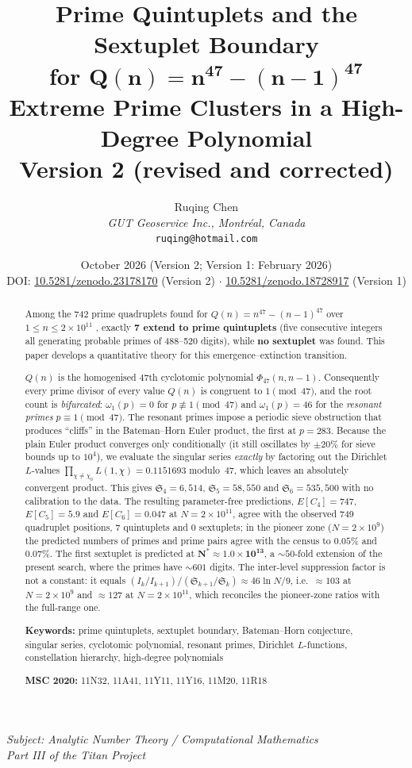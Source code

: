 ﻿\documentclass[11pt,a4paper]{article}
\title{\textbf{Prime Quintuplets and the Sextuplet Boundary} \\[6pt]
\textbf{for} $\boldsymbol{Q(n) = n^{47} - (n-1)^{47}}$ \\[6pt]
\large Extreme Prime Clusters in a High-Degree Polynomial \\[4pt]
\normalsize Version 2 (revised and corrected)}
\author{Ruqing Chen \\[4pt]
\textit{GUT Geoservice Inc., Montr\'eal, Canada} \\
\texttt{ruqing@hotmail.com}}
\date{October 2026 (Version 2; Version 1: February 2026) \\[6pt]
\normalsize DOI: \href{https://doi.org/10.5281/zenodo.23178170}{10.5281/zenodo.23178170} (Version 2)
\quad $\cdot$ \quad
\href{https://doi.org/10.5281/zenodo.18728917}{10.5281/zenodo.18728917} (Version 1)}
\newcommand{\Sk}[1]{\mathfrak{S}_{#1}}
\begin{document}
\maketitle
\thispagestyle{fancy}

\begin{center}
\textit{Subject: Analytic Number Theory / Computational Mathematics} \\[4pt]
\textit{Part III of the Titan Project}
\end{center}

\begin{abstract}
Among the 742 prime quadruplets found for
$Q(n) = n^{47} - (n{-}1)^{47}$ over $1 \leq n \leq 2 \times 10^{11}$
\cite{Chen2026b}, exactly \textbf{7 extend to prime quintuplets}
(five consecutive integers all generating probable primes of
488--520 digits), while \textbf{no sextuplet} was found.
This paper develops a quantitative theory for this emergence--extinction
transition.

$Q(n)$ is the homogenised 47th cyclotomic polynomial $\Phi_{47}(n, n{-}1)$.
Consequently every prime divisor of every value $Q(n)$ is congruent to
$1 \pmod{47}$, and the root count is \emph{bifurcated}:
$\omega_1(p) = 0$ for $p \not\equiv 1 \pmod{47}$ and
$\omega_1(p) = 46$ for the \emph{resonant primes} $p \equiv 1 \pmod{47}$.
The resonant primes impose a periodic sieve obstruction that produces
``cliffs'' in the Bateman--Horn Euler product, the first at $p = 283$.
Because the plain Euler product converges only conditionally (it still
oscillates by $\pm 20\%$ for sieve bounds up to $10^4$), we evaluate the
singular series \emph{exactly} by factoring out the Dirichlet $L$-values
$\prod_{\chi \neq \chi_0} L(1,\chi) = 0.1151693$ modulo~47, which leaves an
absolutely convergent product.  This gives
$\Sk{4} = 6{,}514$, $\Sk{5} = 58{,}550$ and $\Sk{6} = 535{,}500$
with no calibration to the data.
The resulting parameter-free predictions,
$E[C_4] = 747$, $E[C_5] = 5.9$ and $E[C_6] = 0.047$ at $N = 2 \times 10^{11}$,
agree with the observed 749 quadruplet positions, 7 quintuplets and 0 sextuplets;
in the pioneer zone ($N = 2 \times 10^9$) the predicted numbers of primes
and prime pairs agree with the census to $0.05\%$ and $0.07\%$.
The first sextuplet is predicted at
$\boldsymbol{N^* \approx 1.0 \times 10^{13}}$,
a ${\sim}50$-fold extension of the present search, where the primes have
${\sim}601$ digits.  The inter-level suppression factor is not a constant:
it equals $(I_k/I_{k+1})/(\Sk{k+1}/\Sk{k}) \approx 46\ln N / 9$, i.e.\
${\approx}103$ at $N = 2 \times 10^9$ and ${\approx}127$ at $N = 2 \times 10^{11}$,
which reconciles the pioneer-zone ratios with the full-range one.

\medskip
\noindent\textbf{Keywords:}
prime quintuplets, sextuplet boundary, Bateman--Horn conjecture,
singular series, cyclotomic polynomial, resonant primes, Dirichlet $L$-functions,
constellation hierarchy, high-degree polynomials

\medskip
\noindent\textbf{MSC 2020:} 11N32, 11A41, 11Y11, 11Y16, 11M20, 11R18
\end{abstract}
\end{document}
